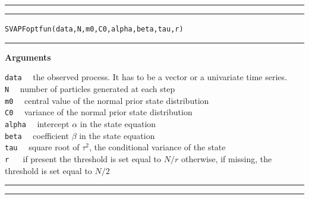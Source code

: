 \documentclass[
]{book}
\theoremstyle{break}
\theoremstyle{nonumberplain}
\begin{document}
\hrule
\hrule

\texttt{SVAPFoptfun(data,N,m0,C0,alpha,beta,tau,r)}\\

\hrule

\textbf{Arguments}

\texttt{data} ~~the observed process. It has to be a vector or a
univariate time series.\\
\texttt{N} ~~number of particles generated at each step\\
\texttt{m0} ~~central value of the normal prior state distribution\\
\texttt{C0} ~~variance of the normal prior state distribution\\
\texttt{alpha} ~~intercept \(\alpha\) in the state equation\\
\texttt{beta} ~~coefficient \(\beta\) in the state equation\\
\texttt{tau} ~~square root of \(\tau^2\), the conditional variance of
the state\\
\texttt{r} ~~ if present the threshold is set equal to \(N/r\)
otherwise, if missing, the threshold is set equal to \(N/2\)

\hrule
\hrule
\end{document}
